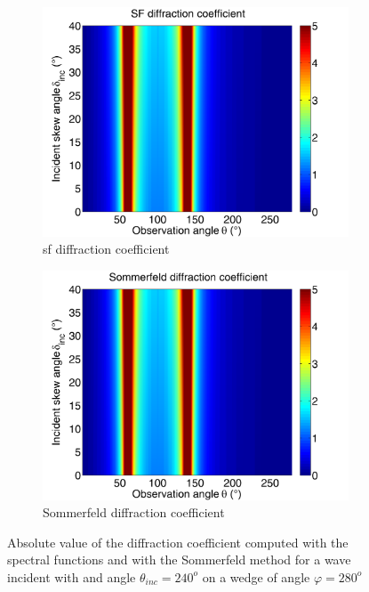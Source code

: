 \begin{figure}
\centering
\begin{subfigure}[b]{0.49\textwidth}
        \includegraphics[width=\textwidth]{images/chapter4/Xprop_280_239.png}
        \caption{\acrshort{sf} diffraction coefficient}
        \label{C4:acSF280240}
    \end{subfigure}
\begin{subfigure}[b]{0.49\textwidth}
        \includegraphics[width=\textwidth]{images/chapter4/Sommerfeld_280_239.png}
        \caption{Sommerfeld diffraction coefficient}
        \label{C4:Som280240}
    \end{subfigure}
\caption{Absolute value of the diffraction coefficient computed with the spectral functions and with the Sommerfeld method for a wave incident with and angle $\theta_{inc}=240^o$ on a wedge of angle $\varphi=280^o$}
\label{C4:ac280240}
\end{figure}

